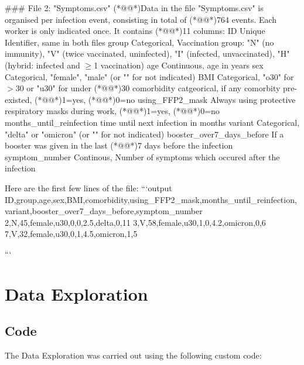 \documentclass[11pt]{article}
\begin{document}
\begin{codeoutput}
\#\#\# File 2: "Symptoms.csv"
(*@@*)Data in the file "Symptoms.csv" is organised per infection event, consisting in total of (*@@*)764 events. Each worker is only indicated once. It contains (*@@*)11 columns:
ID	Unique Identifier, same in both files
group	Categorical, Vaccination group: "N" (no immunity), "V" (twice vaccinated, uninfected), "I" (infected, unvaccinated), "H" (hybrid: infected and $\geq$1 vaccination)
age	Continuous, age in years 
sex	Categorical, "female", "male" (or "" for not indicated)	
BMI	Categorical, "o30" for $>$30 or "u30" for under (*@@*)30	
comorbidity catgeorical, if any comorbity pre-existed, (*@@*)1=yes, (*@@*)0=no	
using\_FFP2\_mask	Always using protective respiratory masks during work, (*@@*)1=yes, (*@@*)0=no 
months\_until\_reinfection	time until next infection in months	
variant	Categorical, "delta" or "omicron" (or "" for not indicated)	
booster\_over7\_days\_before	If a booster was given in the last (*@@*)7 days before the infection	
symptom\_number	Continous, Number of symptoms which occured after the infection

Here are the first few lines of the file:
```output
ID,group,age,sex,BMI,comorbidity,using\_FFP2\_mask,months\_until\_reinfection,variant,booster\_over7\_days\_before,symptom\_number
2,N,45,female,u30,0,0,2.5,delta,0,11
3,V,58,female,u30,1,0,4.2,omicron,0,6
7,V,32,female,u30,0,1,4.5,omicron,1,5

```


\end{codeoutput}

\section{Data Exploration}
\subsection{{Code}}
The Data Exploration was carried out using the following custom code:
\end{document}
